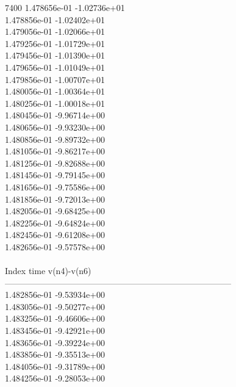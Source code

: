 7400	1.478656e-01	-1.02736e+01	\\ 	1.478856e-01	-1.02402e+01	\\ 	1.479056e-01	-1.02066e+01	\\ 	1.479256e-01	-1.01729e+01	\\ 	1.479456e-01	-1.01390e+01	\\ 	1.479656e-01	-1.01049e+01	\\ 	1.479856e-01	-1.00707e+01	\\ 	1.480056e-01	-1.00364e+01	\\ 	1.480256e-01	-1.00018e+01	\\ 	1.480456e-01	-9.96714e+00	\\ 	1.480656e-01	-9.93230e+00	\\ 	1.480856e-01	-9.89732e+00	\\ 	1.481056e-01	-9.86217e+00	\\ 	1.481256e-01	-9.82688e+00	\\ 	1.481456e-01	-9.79145e+00	\\ 	1.481656e-01	-9.75586e+00	\\ 	1.481856e-01	-9.72013e+00	\\ 	1.482056e-01	-9.68425e+00	\\ 	1.482256e-01	-9.64824e+00	\\ 	1.482456e-01	-9.61208e+00	\\ 	1.482656e-01	-9.57578e+00	\\ \hline
\\ \hline
Index   time            v(n4)-v(n6)     \\ \hline
--------------------------------------------------------------------------------\\ 	1.482856e-01	-9.53934e+00	\\ 	1.483056e-01	-9.50277e+00	\\ 	1.483256e-01	-9.46606e+00	\\ 	1.483456e-01	-9.42921e+00	\\ 	1.483656e-01	-9.39224e+00	\\ 	1.483856e-01	-9.35513e+00	\\ 	1.484056e-01	-9.31789e+00	\\ 	1.484256e-01	-9.28053e+00	\\ \hline
